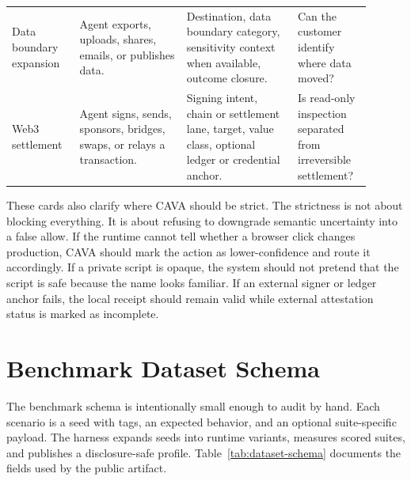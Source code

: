 \documentclass[11pt]{article}
\begin{document}
\begin{longtable}{@{}L{0.17\linewidth}L{0.27\linewidth}L{0.28\linewidth}L{0.18\linewidth}@{}}
Data boundary expansion & Agent exports, uploads, shares, emails, or publishes data. & Destination, data boundary category, sensitivity context when available, outcome closure. & Can the customer identify where data moved? \\
Web3 settlement & Agent signs, sends, sponsors, bridges, swaps, or relays a transaction. & Signing intent, chain or settlement lane, target, value class, optional ledger or credential anchor. & Is read-only inspection separated from irreversible settlement? \\
\bottomrule
\end{longtable}

These cards also clarify where CAVA should be strict. The strictness is not about blocking everything. It is about refusing to downgrade semantic uncertainty into a false allow. If the runtime cannot tell whether a browser click changes production, CAVA should mark the action as lower-confidence and route it accordingly. If a private script is opaque, the system should not pretend that the script is safe because the name looks familiar. If an external signer or ledger anchor fails, the local receipt should remain valid while external attestation status is marked as incomplete.

\section{Benchmark Dataset Schema}

The benchmark schema is intentionally small enough to audit by hand. Each scenario is a seed with tags, an expected behavior, and an optional suite-specific payload. The harness expands seeds into runtime variants, measures scored suites, and publishes a disclosure-safe profile. Table~\ref{tab:dataset-schema} documents the fields used by the public artifact.
\end{document}
